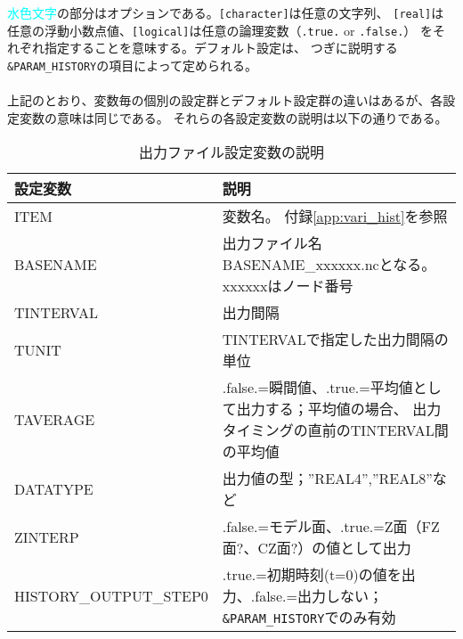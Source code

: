 \textcolor{cyan}{水色文字}の部分はオプションである。\verb|[character]|は任意の文字列、
\verb|[real]|は任意の浮動小数点値、\verb|[logical]|は任意の論理変数（\verb|.true.| or \verb|.false.|）
をそれぞれ指定することを意味する。デフォルト設定は、
つぎに説明する\verb|&PARAM_HISTORY|の項目によって定められる。\\

\\

上記のとおり、変数毎の個別の設定群とデフォルト設定群の違いはあるが、各設定変数の意味は同じである。
それらの各設定変数の説明は以下の通りである。\\

\begin{table}[htb]
\begin{center}
\caption{出力ファイル設定変数の説明}
\begin{tabularx}{150mm}{|l|X|} \hline
 \rowcolor[gray]{0.9} 設定変数 & 説明 \\ \hline
 ITEM                   & 変数名。 付録\ref{app:vari_hist}を参照\\ \hline
 BASENAME               & 出力ファイル名 BASENAME\_xxxxxx.ncとなる。xxxxxxはノード番号\\ \hline
 TINTERVAL              & 出力間隔\\ \hline
 TUNIT                  & TINTERVALで指定した出力間隔の単位\\ \hline
 TAVERAGE               & .false.=瞬間値、.true.=平均値として出力する；平均値の場合、
 出力タイミングの直前のTINTERVAL間の平均値\\ \hline
 DATATYPE               & 出力値の型；''REAL4'',''REAL8''など\\ \hline
 ZINTERP                & .false.=モデル面、.true.=Z面（FZ面$?$、CZ面$?$）の値として出力\\ \hline
 HISTORY\_OUTPUT\_STEP0 & .true.=初期時刻(t=0)の値を出力、.false.=出力しない；\verb|&PARAM_HISTORY|でのみ有効\\ \hline
\end{tabularx}
\label{tab:history_settings}
\end{center}
\end{table}


